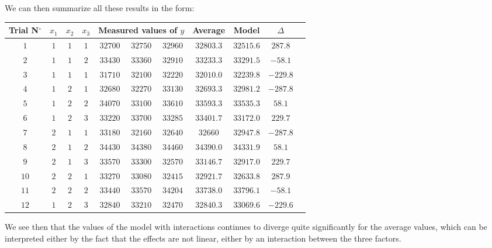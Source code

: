 	We can then summarize all these results in the form:
	\begin{table}[H]\centering
		\begin{center}
		\begin{tabular}{|c|c|c|c|c|c|c|c|c|c|c|}
		\hline
		\multicolumn{1}{c}{\cellcolor{black!30}\textbf{Trial N${}^\circ$}} & 
	  \multicolumn{1}{c}{\cellcolor{black!30}$x_1$} & 
	  \multicolumn{1}{c}{\cellcolor{black!30}$x_2$} & 
	  \multicolumn{1}{c}{\cellcolor{black!30}$x_3$} & 
	  \multicolumn{3}{c|}{\cellcolor{black!30}\textbf{Measured values of $y$}} & 
	  \multicolumn{1}{c}{\cellcolor{black!30}\textbf{Average}} & 
	  \multicolumn{1}{c}{\cellcolor{black!30}\textbf{Model}} & 
	  \multicolumn{1}{c}{\cellcolor{black!30}\textbf{$\Delta$}}                                                                                                                                                                         \\ \hline
		$1$ & $1$ & $1$ & $1$ & $32700$ & $32750$ & $32960$ & $32803.3$ & $32515.6$ & $287.8$\\ \hline
		$2$ & $1$ & $1$ & $2$ & $33430$ & $33360$ & $32910$ & $33233.3$ & $33291.5$ & $-58.1$\\ \hline
		$3$ & $1$ & $1$ & $1$ & $31710$ & $32100$ & $32220$ & $32010.0$ & $32239.8$ & $-229.8$\\ \hline
		$4$ & $1$ & $2$ & $1$ & $32680$ & $32270$ & $33130$ & $32693.3$ & $32981.2$ & $-287.8$\\ \hline
		$5$ & $1$ & $2$ & $2$ & $34070$ & $33100$ & $33610$ & $33593.3$ & $33535.3$ & $58.1$\\ \hline
		$6$ & $1$ & $2$ & $3$ & $33220$ & $33700$ & $33285$ & $33401.7$ & $33172.0$ & $229.7$\\ \hline
		$7$ & $2$ & $1$ & $1$ & $33180$ & $32160$ & $32640$ & $32660$ & $32947.8$ & $-287.8$\\ \hline
		$8$ & $2$ & $1$ & $2$ & $34430$ & $34380$ & $34460$ & $34390.0$ & $34331.9$ & $58.1$\\ \hline
		$9$ & $2$ & $1$ & $3$ & $33570$ & $33300$ & $32570$ & $33146.7$ & $32917.0$ & $229.7$\\ \hline
		$10$ & $2$ & $2$ & $1$ & $33270$ & $33080$ & $32415$ & $32921.7$ & $32633.8$ & $287.9$\\ \hline
		$11$ & $2$ & $2$ & $2$ & $33440$ & $33570$ & $34204$ & $33738.0$ & $33796.1$ & $-58.1$
\\ \hline
		$12$ & $1$ & $2$ & $3$ & $32840$ & $33210$ & $32470$ & $32840.3$ & $33069.6$ & $-229.6$\\ \hline
	 	\end{tabular}
		\end{center}
	\end{table}
	We see then that the values of the model with interactions continues to diverge quite significantly for the average values, which can be interpreted either by the fact that the effects are not linear, either by an interaction between the three factors.\\
	
